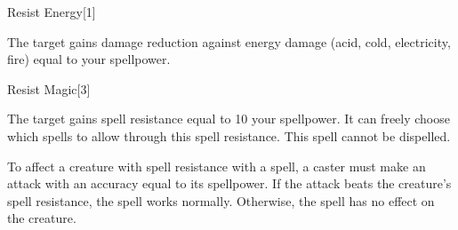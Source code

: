 \begin{spellsection}{Resist Energy}[1]
    \begin{spellheader}
    \end{spellheader}
    \begin{spellcontent}
        \begin{spelltargetinginfo}
        \end{spelltargetinginfo}
        \begin{spelleffects}
            \spelleffect The target gains damage reduction against energy damage (acid, cold, electricity, fire) equal to your spellpower.
            \spelldur \durshort
        \end{spelleffects}
    \end{spellcontent}
    \begin{spellfooter}
        \miscastexplode
    \end{spellfooter}
    \begin{spellaugments}
    \end{spellaugments}
\end{spellsection}

\begin{spellsection}{Resist Magic}[3]
    \begin{spellheader}
    \end{spellheader}
    \begin{spellcontent}
        \begin{spelltargetinginfo}
        \end{spelltargetinginfo}
        \begin{spelleffects}
            \spelleffect The target gains spell resistance equal to 10 \add your spellpower.
            It can freely choose which spells to allow through this spell resistance.
            \spelldur \durshort
            \spellspecial This spell cannot be dispelled.
        \end{spelleffects}
    \end{spellcontent}
    \begin{spellfooter}
        \spellnotes To affect a creature with spell resistance with a spell, a caster must make an attack with an accuracy equal to its spellpower. If the attack beats the creature's spell resistance, the spell works normally. Otherwise, the spell has no effect on the creature.
        \miscastrandom
    \end{spellfooter}
    \begin{spellaugments}
    \end{spellaugments}
\end{spellsection}

